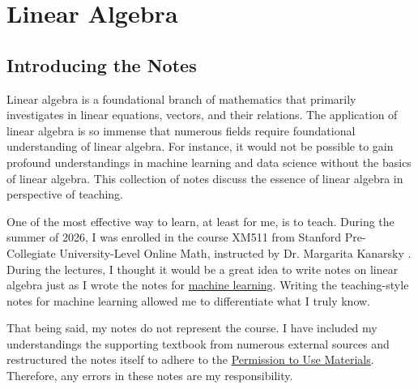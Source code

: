 \documentclass[../../main.tex]{subfiles}
\begin{document}
\part{Linear Algebra}\label{part:MATH02}
\localtableofcontents

\chapter*{Introducing the Notes}

Linear algebra is a foundational branch of mathematics that
primarily investigates in linear equations, vectors, and their
relations. The application of linear algebra is so immense that
numerous fields require foundational understanding of linear
algebra. For instance, it would not be possible to gain
profound understandings in machine learning and data science
without the basics of linear algebra. This collection of notes
discuss the essence of linear algebra in perspective of teaching.

One of the most effective way to learn, at least for me, is to
teach. During the summer of 2026, I was enrolled in the course
XM511 from Stanford Pre-Collegiate University-Level Online Math,
instructed by Dr. Margarita Kanarsky \cite{MATH02-1}. During the
lectures, I thought it would be a great idea to write notes on linear
algebra just as I wrote the notes for
\href{https://github.com/enochness/LibreNotebook}{machine learning}.
Writing the teaching-style notes for machine learning allowed
me to differentiate what I truly know.

That being said, my notes do not represent the course. I have
included my understandings the supporting textbook \cite{MATH02-2}
from numerous external sources and restructured the notes itself to
adhere to the \href{https://www.stanford.edu/site/terms/}{Permission
to Use Materials}. Therefore, any errors in these notes are my
responsibility.






























\end{document}
